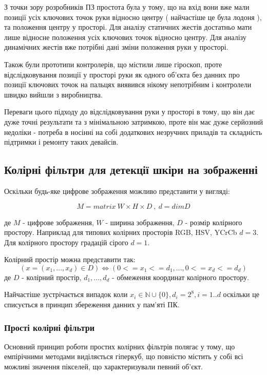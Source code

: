 З точки зору розробників ПЗ простота була у тому, що на вхід вони вже мали позиції усіх ключових точок руки відносно центру ( найчастіше це була лодоня ), та положення центру у просторі. Для аналізу статичних жестів достатньо мати лише відносне положення усіх ключових точок відносно центру. Для аналізу динамічних жестів вже потрібні дані зміни положення руки у просторі.

Також були прототипи контролерів, що містили лише гіроскоп, проте відслідковування позиції у просторі руки як одного об'єкта без данних про позиції ключових точок на пальцях виявився нікому непотрібним і контролели швидко вийшли з виробництва.

Переваги цього підходу до відслідковування руки у просторі в тому, що він дає дуже точні результати та з мінімальною затримкою, проте він має дуже серйозний недоліки - потреба в носінні на собі додаткових незручних приладів та складність підтримки і ремонту таких девайсів.

\subsection{Колірні фільтри для детекції шкіри на зображенні}

Оскільки будь-яке цифрове зображення можливо представити у вигляді:

\begin{equation}
	\label{eq:digital_image_representation}
	M = matrix \: W \times H \times D \: , \: d = dimD
\end{equation}

де $M$ - цифрове зображення, $W$ - ширина зображення, $D$ - розмір колірного простору.
Наприклад для типових колірних просторів RGB, HSV, YCrCb $d = 3$. Для колірного простору градацій сірого $d = 1$.

Колірний простір можна представити так:
\begin{equation}
	\label{eq:color_space_representation}
	( x=(x_1,...,x_d) \in D) \Leftrightarrow ( 0<=x_1<=d_1, ... , 0<=x_d<=d_d )	
\end{equation}
де $D$ - колірний простір, $d_1,...,d_d$ - обмеження координат колірного простору.

Найчастіше зустрічається випадок коли $x_i \in \mathbb{N} \cup \{0\}, d_i = 2^8 , i=1..d$ оскільки це списується в принцип збереження данних у пам'яті ПК.


\subsubsection{Прості колірні фільтри}
Основний принцип роботи простих колірних фільтрів полягає у тому, що емпірічними методами виділяється гіперкуб, що повністю містить у собі всі можливі значення пікселей, що характеризували певний об'єкт.

